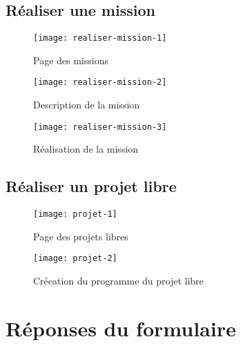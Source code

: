 \FloatBarrier
\subsection{Réaliser une mission}
\begin{figure}
  \begin{center}
    \texttt{[image: realiser-mission-1]}
    \caption{Page des missions}
    \label{fig:realiser-mission-1}
  \end{center}
\end{figure}
\begin{figure}
  \begin{center}
    \texttt{[image: realiser-mission-2]}
    \caption{Description de la mission}
    \label{fig:realiser-mission-2}
  \end{center}
\end{figure}
\begin{figure}
  \begin{center}
    \texttt{[image: realiser-mission-3]}
    \caption{Réalisation de la mission}
    \label{fig:realiser-mission-3}
  \end{center}
\end{figure}

\FloatBarrier
\subsection{Réaliser un projet libre}
\begin{figure}
  \begin{center}
    \texttt{[image: projet-1]}
    \caption{Page des projets libres}
    \label{fig:projet-1}
  \end{center}
\end{figure}
\begin{figure}
  \begin{center}
    \texttt{[image: projet-2]}
    \caption{Créeation du programme du projet libre}
    \label{fig:projet-2}
  \end{center}
\end{figure}

\FloatBarrier
\section{Réponses du formulaire}

